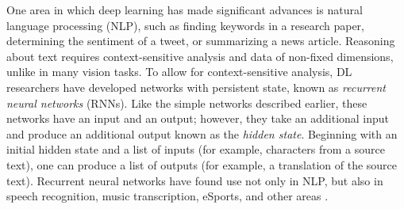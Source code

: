 
One area in which deep learning has made significant advances is
  natural language processing (NLP), such as finding keywords in a
  research paper, determining the sentiment of a tweet,
  or summarizing a news article.
Reasoning about text requires context-sensitive analysis and data of
  non-fixed dimensions, unlike in many vision tasks.
To allow for context-sensitive analysis, DL researchers have developed networks with persistent
state, known as \textit{recurrent neural networks}  (RNNs). Like the simple networks described
earlier, these networks have an input and an output; however, they take an additional input and
produce an additional output known as the \textit{hidden state}. Beginning with an initial hidden
state and a list of inputs (for example, characters from a source text), one can produce a
list of outputs (for example, a translation of the source text). %
Recurrent neural networks have found use not only in NLP, but also in speech recognition, music
transcription, eSports, and other areas \citep{lstm, speech_recognition, OpenAI_dota}.

